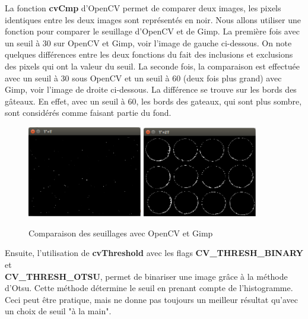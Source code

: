 La fonction \textbf{cvCmp} d'OpenCV permet de comparer deux images, les pixels identiques entre les deux images sont représentés 
en noir. Nous allons utiliser une fonction pour comparer le seuillage d'OpenCV et de Gimp. La première fois avec un seuil à 30 sur 
OpenCV et Gimp, voir l'image de gauche ci-dessous. On note quelques différences entre les deux fonctions du fait des inclusions 
et exclusions des pixels qui ont la valeur du seuil. La seconde fois, la comparaison est effectuée avec un seuil à 30 sous OpenCV 
et un seuil à 60 (deux fois plus grand) avec Gimp, voir l'image de droite ci-dessous. La différence se trouve sur les bords des 
gâteaux. En effet, avec un seuil à 60, les bords des gateaux, qui sont plus sombre, sont considérés comme faisant partie du fond.\\

\begin{figure}[H]
      \center
      \includegraphics[width=5cm]{ressources/tp3/compare_T_T.png}
      \includegraphics[width=5cm]{ressources/tp3/compare_T_2T.png}
      \caption{Comparaison des seuillages avec OpenCV et Gimp}
\end{figure}

Ensuite, l'utilisation de \textbf{cvThreshold} avec les flags \textbf{CV\_THRESH\_BINARY} et \\ \textbf{CV\_THRESH\_OTSU}, permet de binariser 
une image grâce à la méthode d'Otsu. Cette méthode détermine le seuil en prenant compte de l'histogramme. Ceci peut être pratique, mais ne 
donne pas toujours un meilleur résultat qu'avec un choix de seuil "à la main".

